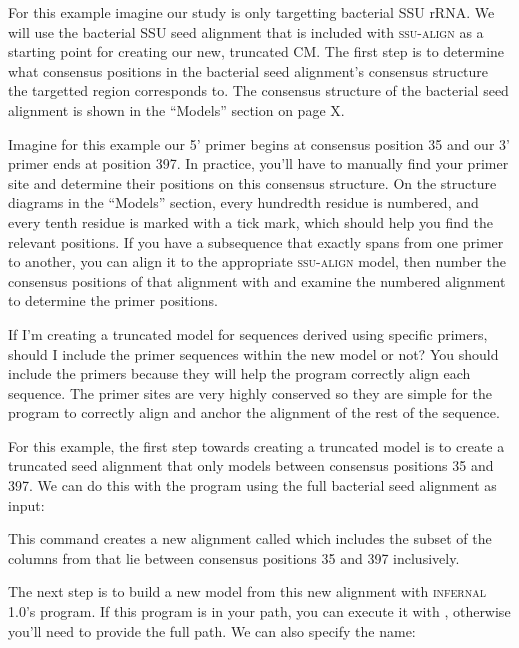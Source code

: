 For this example imagine our study is only targetting bacterial SSU
rRNA. We will use the bacterial SSU seed alignment that is included
with \textsc{ssu-align} as a starting point for creating our new,
truncated CM. The first step is to determine what consensus positions
in the bacterial seed alignment's consensus structure the targetted
region corresponds to. The consensus structure of the bacterial seed
alignment is shown in the ``Models'' section on page X.

Imagine for this example our 5' primer begins at consensus position 35
and our 3' primer ends at position 397.  In practice, you'll have to
manually find your primer site and determine their positions on this
consensus structure. On the structure diagrams in the ``Models''
section, every hundredth residue is numbered, and every tenth residue
is marked with a tick mark, which should help you find the relevant
positions.  If you have a subsequence that exactly spans from one
primer to another, you can align it to the appropriate
\textsc{ssu-align} model, then number the consensus positions of that
alignment with  and examine the numbered
alignment to determine the primer positions.

\begin{srefaq}{If I'm creating a truncated model for sequences derived
    using specific primers, should I include the primer sequences
    within the new model or not?} You should include the primers
  because they will help the program correctly align each
  sequence. The primer sites are very highly conserved so they are
  simple for the program to correctly align and anchor the alignment
  of the rest of the sequence.
\end{srefaq}

For this example, the first step towards creating a truncated model is
to create a truncated seed alignment that only models between
consensus positions 35 and 397. We can do this with the
 program using the full bacterial seed alignment as
input:


This command creates a new alignment called  which
includes the subset of the columns from  that lie
between consensus positions 35 and 397 inclusively.

The next step is to build a new model from this new alignment with
\textsc{infernal} 1.0's  program. If this program is in
your path, you can execute it with , otherwise you'll
need to provide the full path. We can also specify the name:

